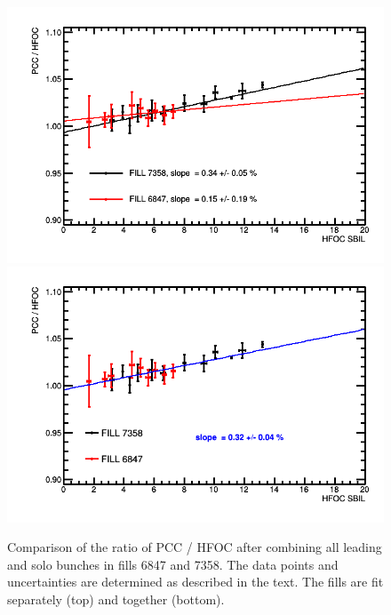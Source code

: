 \clearpage
\begin{figure}[t]
  \begin{center}
    \includegraphics[width=0.7\linewidth]{plots/sbilratios_singles_combined/compareFills_graph_fillstogether.png}
    \includegraphics[width=0.7\linewidth]{plots/sbilratios_singles_combined/compareFills_graph_fillstogether_onefit.png}
    \caption{
      Comparison of the ratio of PCC / HFOC after combining all leading and solo bunches in fills 6847 and 7358.
      The data points and uncertainties are determined as described in the text.
      The fills are fit separately (top) and together (bottom).
      \label{fig:sbilratiosresultscombined}
    }
  \end{center}
\end{figure}
